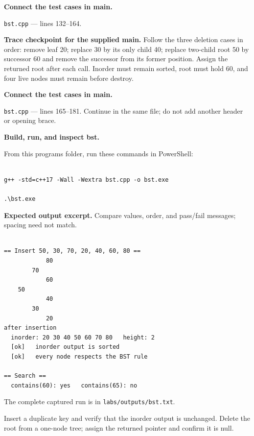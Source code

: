 \tcbbreak

\begin{utpsteps}\setcounter{enumi}{4}\item \textbf{Connect the test cases in main.}\end{utpsteps}

\texttt{bst.cpp} --- lines 132--164.



\textbf{Trace checkpoint for the supplied main.} Follow the three deletion cases in order: remove leaf 20; replace 30 by its only child 40; replace two-child root 50 by successor 60 and remove the successor from its former position. Assign the returned root after each call. Inorder must remain sorted, root must hold 60, and four live nodes must remain before destroy.




\tcbbreak

\begin{utpsteps}\setcounter{enumi}{5}\item \textbf{Connect the test cases in main.}\end{utpsteps}

\texttt{bst.cpp} --- lines 165--181. Continue in the same file; do not add another header or opening brace.




\tcbbreak

\textbf{Build, run, and inspect bst.}

From this program\textquotesingle s folder, run these commands in PowerShell:

\begin{lstlisting}[style=utpterminal,language={}]

g++ -std=c++17 -Wall -Wextra bst.cpp -o bst.exe

.\bst.exe

\end{lstlisting}

\textbf{Expected output excerpt.} Compare values, order, and pass/fail messages; spacing need not match.

\begin{lstlisting}[style=utpterminal,language={}]

== Insert 50, 30, 70, 20, 40, 60, 80 ==
            80
        70
            60
    50
            40
        30
            20
after insertion
  inorder: 20 30 40 50 60 70 80   height: 2
  [ok]   inorder output is sorted
  [ok]   every node respects the BST rule

== Search ==
  contains(60): yes   contains(65): no

\end{lstlisting}

The complete captured run is in \texttt{labs/outputs/bst.txt}.

\begin{tryit}

Insert a duplicate key and verify that the inorder output is unchanged. Delete the root from a one-node tree; assign the returned pointer and confirm it is null.

\end{tryit}

